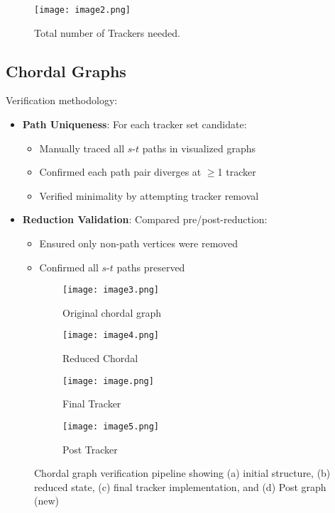 \documentclass{article}
\begin{document}
\begin{figure}[H]
\centering
\texttt{[image: image2.png]}
\caption{Total number of Trackers needed.}
\label{fig:tracker-identification}
\end{figure}

\subsection*{Chordal Graphs}
Verification methodology:
\begin{itemize}
    \item \textbf{Path Uniqueness}: For each tracker set candidate:
    \begin{itemize}
        \item Manually traced all $s$-$t$ paths in visualized graphs
        \item Confirmed each path pair diverges at $\geq$1 tracker
        \item Verified minimality by attempting tracker removal
    \end{itemize}
    
    \item \textbf{Reduction Validation}: Compared pre/post-reduction:
    \begin{itemize}
        \item Ensured only non-path vertices were removed
        \item Confirmed all $s$-$t$ paths preserved
    \end{itemize}
\end{itemize}

\begin{figure}[H]
\centering
\begin{subfigure}{0.35\textwidth}  %
    \texttt{[image: image3.png]}
    \caption{Original chordal graph}
    \label{fig:chordal-orig}
\end{subfigure}
\hfill
\begin{subfigure}{0.35\textwidth}  %
    \texttt{[image: image4.png]}
    \caption{Reduced Chordal}
    \label{fig:chordal-reduced}
\end{subfigure}

\vspace{0.3cm}  %

\begin{subfigure}{0.35\textwidth}  %
    \texttt{[image: image.png]}
    \caption{Final Tracker}
    \label{fig:chordal-implemented}
\end{subfigure}
\hfill
\begin{subfigure}{0.35\textwidth}  %
    \texttt{[image: image5.png]}
    \caption{Post Tracker}
    \label{fig:chordal-trackers}
\end{subfigure}
\caption{Chordal graph verification pipeline showing (a) initial structure, (b) reduced state, (c) final tracker implementation, and (d) Post graph (new)}
\label{fig:chordal-process}
\end{figure}
\end{document}
